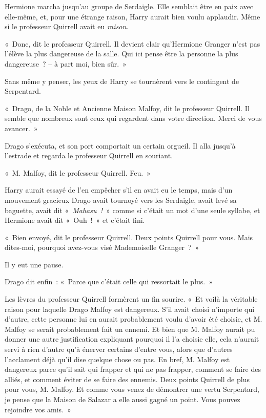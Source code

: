 Hermione marcha jusqu'au groupe de Serdaigle. Elle semblait être en paix avec elle-même, et, pour une étrange raison, Harry aurait bien voulu applaudir. Même si le professeur Quirrell avait eu \emph{raison}.

«~Donc, dit le professeur Quirrell. Il devient clair qu'Hermione Granger n'est pas l'élève la plus dangereuse de la salle. Qui ici pense être la personne la plus dangereuse~? -- à part moi, bien sûr.~»

Sans même y penser, les yeux de Harry se tournèrent vers le contingent de Serpentard.

«~Drago, de la Noble et Ancienne Maison Malfoy, dit le professeur Quirrell. Il semble que nombreux sont ceux qui regardent dans votre direction. Merci de vous avancer.~»

Drago s'exécuta, et son port comportait un certain orgueil. Il alla jusqu'à l'estrade et regarda le professeur Quirrell en souriant.

«~M. Malfoy, dit le professeur Quirrell. Feu.~»

Harry aurait essayé de l'en empêcher s'il en avait eu le temps, mais d'un mouvement gracieux Drago avait tournoyé vers les Serdaigle, avait levé sa baguette, avait dit «~\emph{Mahasu~!}~» comme si c'était un mot d'une seule syllabe, et Hermione avait dit «~Ouh~!~» et c'était fini.

«~Bien envoyé, dit le professeur Quirrell. Deux points Quirrell pour vous. Mais dites-moi, pourquoi avez-vous visé Mademoiselle Granger~?~»

Il y eut une pause.

Drago dit enfin~: «~Parce que c'était celle qui ressortait le plus.~»

Les lèvres du professeur Quirrell formèrent un fin sourire. «~Et voilà la véritable raison pour laquelle Drago Malfoy est dangereux. S'il avait choisi n'importe qui d'autre, cette personne lui en aurait probablement voulu d'avoir été choisie, et M. Malfoy se serait probablement fait un ennemi. Et bien que M. Malfoy aurait pu donner une autre justification expliquant pourquoi il l'a choisie elle, cela n'aurait servi à rien d'autre qu'à énerver certains d'entre vous, alors que d'autres l'acclament déjà qu'il dise quelque chose ou pas. En bref, M. Malfoy est dangereux parce qu'il sait qui frapper et qui ne pas frapper, comment se faire des alliés, et comment éviter de se faire des ennemis. Deux points Quirrell de plus pour vous, M. Malfoy. Et comme vous venez de démontrer une vertu Serpentard, je pense que la Maison de Salazar a elle aussi gagné un point. Vous pouvez rejoindre vos amis.~»

